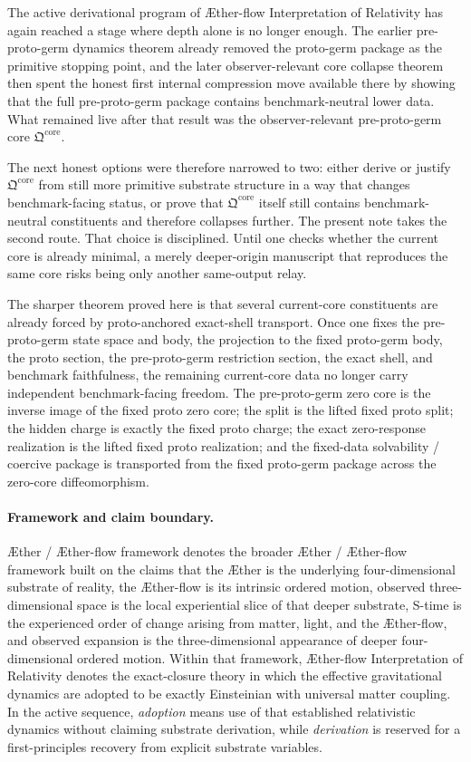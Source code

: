 \documentclass[11pt]{article}
\newcommand{\Aether}{\AE{}ther}
\newcommand{\Aflow}{\AE{}ther-flow}
\newcommand{\TheoryName}{\Aflow{} Interpretation of Relativity}
\newcommand{\TheoryProgram}{\Aether{} / \Aflow{} framework}
\newcommand{\PreProtoCore}{\mathfrak Q^{\mathrm{core}}}
\begin{document}
The active derivational program of \TheoryName{} has again reached a stage where depth alone is no longer enough. The earlier pre-proto-germ dynamics theorem already removed the proto-germ package as the primitive stopping point, and the later observer-relevant core collapse theorem then spent the honest first internal compression move available there by showing that the full pre-proto-germ package contains benchmark-neutral lower data. What remained live after that result was the observer-relevant pre-proto-germ core \(\PreProtoCore\).

The next honest options were therefore narrowed to two: either derive or justify \(\PreProtoCore\) from still more primitive substrate structure in a way that changes benchmark-facing status, or prove that \(\PreProtoCore\) itself still contains benchmark-neutral constituents and therefore collapses further. The present note takes the second route. That choice is disciplined. Until one checks whether the current core is already minimal, a merely deeper-origin manuscript that reproduces the same core risks being only another same-output relay.

The sharper theorem proved here is that several current-core constituents are already forced by proto-anchored exact-shell transport. Once one fixes the pre-proto-germ state space and body, the projection to the fixed proto-germ body, the proto section, the pre-proto-germ restriction section, the exact shell, and benchmark faithfulness, the remaining current-core data no longer carry independent benchmark-facing freedom. The pre-proto-germ zero core is the inverse image of the fixed proto zero core; the split is the lifted fixed proto split; the hidden charge is exactly the fixed proto charge; the exact zero-response realization is the lifted fixed proto realization; and the fixed-data solvability / coercive package is transported from the fixed proto-germ package across the zero-core diffeomorphism.

\paragraph{Framework and claim boundary.}
\TheoryProgram{} denotes the broader \Aether{} / \Aflow{} framework built on the claims that the \Aether{} is the underlying four-dimensional substrate of reality, the \Aflow{} is its intrinsic ordered motion, observed three-dimensional space is the local experiential slice of that deeper substrate, S-time is the experienced order of change arising from matter, light, and the \Aflow{}, and observed expansion is the three-dimensional appearance of deeper four-dimensional ordered motion. Within that framework, \TheoryName{} denotes the exact-closure theory in which the effective gravitational dynamics are adopted to be exactly Einsteinian with universal matter coupling. In the active sequence, \emph{adoption} means use of that established relativistic dynamics without claiming substrate derivation, while \emph{derivation} is reserved for a first-principles recovery from explicit substrate variables.
\end{document}
